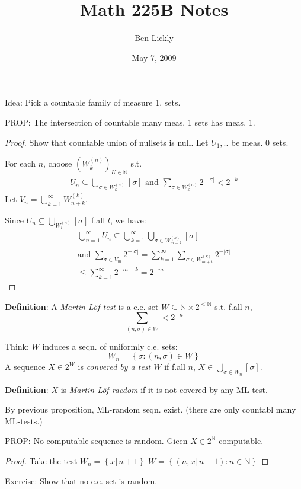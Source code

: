 \documentclass[12pt]{article}
\author{Ben Lickly}
\date{May 7, 2009}
\title{Math 225B Notes}
\newcommand{\Nat}{\ensuremath{\mathbb{N}}}
\newcommand{\defn}{\textbf{Definition}: }
\begin{document}
\maketitle

Idea: Pick a countable family of measure 1. sets.

PROP: The intersection of countable many meas. 1 sets has meas. 1.
\begin{proof}
  Show that countable union of nullsets is null.
  Let $U_1,..$ be meas. 0 sets.

  For each $n$, choose $\left( W^{(n)}_k \right)_{K\in \Nat}$ s.t.
\begin{align}
  U_n \subseteq \bigcup_{\sigma\in W^{(n)}_k} [\sigma]
  \text{ and }
  \sum_{\sigma\in W^{(n)}_k} 2^{-|\sigma|} < 2^{-k}
  \label{eq:plus}
\end{align}
Let $V_n = \bigcup_{k=1}^\infty W^{(k)}_{n+k}$.

Since $U_n \subseteq \bigcup_{W^{(n)}_l} [\sigma]$ f.all $l$,
we have:
\begin{align*}
  \bigcup_{n=1}^\infty U_n \subseteq
  \bigcup_{k=1}^\infty \bigcup_{\sigma\in W^{(k)}_{m+k}}[\sigma] \\
  \text{and }
  \sum_{\sigma \in V_m} 2^{-|\sigma|} = \sum_{k=1}^\infty \sum_{\sigma\in W^{(k)}_{m+k}} 2^{-|\sigma|}
  \\
  \le
  \sum_{k=1}^\infty 2^{-m-k} = 2^{-m}
\end{align*}
\end{proof}

\defn A \emph{Martin-L\"of test} is a c.e. set $W \subseteq \Nat \times 2^{<\Nat}$ s.t. f.all $n$,
\[
\sum_{(n,\sigma) \in W} < 2^{-n}
\]

Think: $W$ induces a seqn. of uniformly c.e. sets:
\[
W_n = \left\{ \sigma : (n,\sigma) \in W \right\}
\]
A sequence $X \in 2^W$ is \emph{convered by a test $W$} if f.all $n$,
$X \in \bigcup_{\sigma \in W_n} [\sigma]$.

\defn $X$ is \emph{Martin-L\"of racdom} if it is not covered by any ML-test.

By previous proposition, ML-random seqn. exist.
(there are only countabl many ML-tests.)

PROP:
No computable sequence is random.
Gicen $X \in 2^\Nat$ computable.
\begin{proof}
  Take the test $W_n = \left\{ x\lceil n+1 \right\}$
  $W = \left\{ (n, x\lceil n+1) : n \in  \Nat \right\}$
\end{proof}

Exercise: Show that no c.e. set is random.
\end{document}

